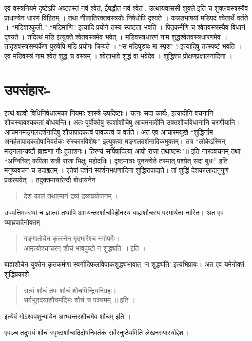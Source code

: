 एवं वस्त्रनियमे दृष्टेऽपि अष्टहस्तं नवं श्वेतं, ईषद्धौतं नवं श्वेतं , उत्थायवाससी शुक्ले इति च शुक्लवस्त्रस्यैव प्राधान्येन धारणं विहितम् । तथा नीलातिरक्तवस्त्रयोः निषेधोपि दृश्यते । कन्नडभाषयां मडिपदं श्वेतार्थे वर्तते । “मडिशश्कुली,” “मडिमाणि” इत्यादि प्रयोगे तस्य स्पष्टता भवति । पितृकर्मणि च श्वेतवस्त्रस्यैव विधानं दृश्यते । तदित्थं मडि इत्युक्ते श्वेतवस्त्रमेव भवेत् । मडिवस्त्रधारणं नाम शुद्धश्वेतवस्त्रधारणमेव । तादृशवस्त्रसम्पर्केण पुरुषेपि मडि प्रयोगः क्रियते । “स मडिपुरुषः मा स्पृश” ! इत्यादिषु तत्स्पष्टं भवति । एवं मडिवस्त्रं नाम श्वेतं शुद्धं च वस्त्रम् । श्वेताभावे शुद्धं वा भवेदेव । शुद्धिश्च प्रोक्षणप्रक्षालनादिना ।

\section*{उपसंहारः-} 

इत्थं बहवो विधिनिषेधात्मका नियमाः शास्त्रे उपदिष्टाः। यत्नः सदा कार्यः, इत्यादीनि वचनानि शौचस्यावश्यकतां बोधयन्ति। अतः पूर्वोक्तेषु स्पर्शाशौचेषु आचमनादीनि उक्तशौचविधानानि चरणीयानि। आचमनमङ्गलदर्शनादिषु शौचापादकत्वं पावकत्वं च वर्तते। अत एव आचारमयूखे “शुद्धिर्नाम अनर्हतापादकदोषानिवर्तकः संस्कारविशेषः” इत्युक्त्वा मङ्गलदर्शनादिकमुक्तम्। तत्र “लोकेऽस्मिन् मङ्गलान्यष्टौ ब्राह्मणा गौः हुताशनः। हिरण्यं सर्पिषादित्या आपो राजा तथाष्टमः”॥ इति नारदवचनम् तथा “अग्निचित् कपिला सत्री राजा भिक्षुः महोदधिः। दृष्टमात्राः पुनन्त्येते तस्मात् पश्येत् सदा बुधः” इति मनुष्यवचनं च उदाहृतम् । एतेषां दर्शनं स्पर्शनभक्षणादिना शुद्धिरापाद्यते। तां शुद्धिं देशकालाद्यनुगुणं प्रकल्पयेत् । तदुक्तमाचारेन्दौ बोधायनेन 
\begin{verse}
देशं कालं तथात्मानं द्रव्यं द्रव्यप्रयोजनम् । 
\end{verse}
उपपत्तिमवस्थां च ज्ञात्वा तथापि आभ्यन्तरशौचविहीनस्य बाह्यशौचस्य परमार्थता नास्ति। अत एव व्याघ्रपादेनोक्तम् 
\begin{verse}
गङ्गातोयेन कृत्स्नेन मृद्भारैश्च नगोपमैः। \\
आमृत्योश्चाचरन् शौचं भावदुष्टो न शुद्ध्यति ॥ इति ।
\end{verse}
बाह्यशौचेन युक्तेन कृतकर्मणा स्वर्गादिफलविपाकशुद्ध्यभावात् ‘न शुद्ध्यति’ इत्यभिप्रायः। अत एव यमेनोक्तं शुद्धिप्रकाशे 
\begin{verse}
सत्यं शौचं तपः शौचं शौचमिन्द्रियनिग्रहः। \\
सर्वभूतदयाशौचमद्भिः शौचं च पञ्चमम् ॥ इति । 
\end{verse}
इत्येवं गोऽश्वपशुन्यायेन आभ्यन्तरशौचमेव शौचम् इति । 

एवञ्च तदुभयं शौचं स्पृष्टाशौचादिदोषनिवर्तकं सर्वैरनुष्ठेयमिति लेखनस्यास्योद्देशः।

\articleend
